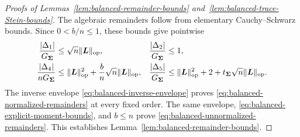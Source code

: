 \documentclass{article}
\theoremstyle{plain}
\theoremstyle{definition}
\theoremstyle{definition}
\DeclarePairedDelimiter\norm{\lVert}{\rVert}
\def\mathbold{\boldsymbol}
\def\bL{\mathbold{L}}\def\hbL{{\widehat{\bL}}}\def\tbL{{\widetilde{\bL}}}
\def\bSigma{\mathbold{\Sigma}}\def\hbSigma{{\widehat{\bSigma}}}
\begin{document}
\begin{proof}[Proofs of Lemmas~\ref{lem:balanced-remainder-bounds}
and~\ref{lem:balanced-trace-Stein-bounds}]
The algebraic remainders follow from elementary Cauchy--Schwarz bounds.
Since $0<b/n\leq1$, these bounds give pointwise
\begin{align*}
    \frac{|\Delta_1|}{G_{\bSigma}}
       &\leq \sqrt n\norm{\bL}_{\rm op},
    &
    \frac{|\Delta_2|}{G_{\bSigma}}
       &\leq1,\\
    \frac{|\Delta_4|}{nG_{\bSigma}}
       &\leq \norm{\bL}_{\rm op}^2
          +\frac bn\sqrt n\norm{\bL}_{\rm op},
    &
    \frac{|\Delta_5|}{G_{\bSigma}}
       &\leq \norm{\bL}_{\rm op}^2+2
          +t_{\bSigma}\sqrt n\norm{\bL}_{\rm op}.
\end{align*}
The inverse envelope \eqref{eq:balanced-inverse-envelope} proves
\eqref{eq:balanced-normalized-remainders} at every fixed order.  The same
envelope, \eqref{eq:balanced-explicit-moment-bounds}, and $b\leq n$ prove
\eqref{eq:balanced-unnormalized-remainders}.  This establishes
Lemma~\ref{lem:balanced-remainder-bounds}.


\end{proof}
\end{document}
